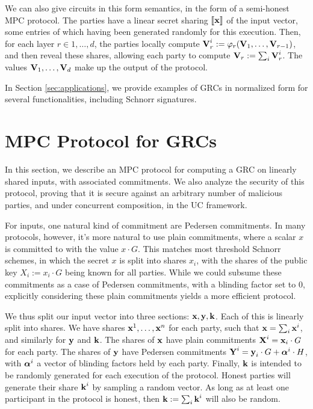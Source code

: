 We can also give circuits in this form semantics, in the form
of a semi-honest MPC protocol.
The parties have a linear secret sharing $\llbracket\textbf{x}\rrbracket$ of
the input vector, some entries of which having been generated randomly
for this execution.
Then, for each layer $r \in 1, \ldots, d$, the parties locally
compute $\textbf{V}_r^i := \varphi_r(\textbf{V}_1, \ldots, \textbf{V}_{r - 1})$,
and then reveal these shares, allowing each party to compute
$\textbf{V}_r := \sum_i \textbf{V}_r^i$.
The values $\textbf{V}_1, \ldots, \textbf{V}_d$ make up the output of the protocol.

In Section \ref{sec:applications}, we provide examples of GRCs
in normalized form for several functionalities, including Schnorr
signatures.

\section{MPC Protocol for GRCs}

In this section, we describe an MPC protocol for computing
a GRC on linearly shared inputs, with associated commitments.
We also analyze the security of this protocol, proving that it
is secure against an arbitrary number of malicious parties,
and under concurrent composition, in the UC framework.

For inputs, one natural kind of commitment are Pedersen commitments.
In many protocols, however, it's more natural to use plain commitments,
where a scalar $x$ is committed to with the value $x \cdot G$.
This matches most threshold Schnorr schemes,
in which the secret $x$ is split into shares $x_i$, with the shares
of the public key $X_i := x_i \cdot G$ being known for all parties.
While we could subsume these commitments as a case of Pedersen commitments,
with a blinding factor set to $0$, explicitly considering these
plain commitments yields a more efficient protocol.

We thus split our input vector into three sections: $\textbf{x}, \textbf{y}, \textbf{k}$.
Each of this is linearly split into shares.
We have shares $\textbf{x}^1, \ldots, \textbf{x}^n$ for each party, such that $\textbf{x} = \sum_i \textbf{x}^i$,
and similarly for $\textbf{y}$ and $\textbf{k}$.
The shares of $\textbf{x}$ have plain commitments $\textbf{X}^i = \textbf{x}_i \cdot G$
for each party.
The shares of $\textbf{y}$ have Pedersen commitments $\textbf{Y}^i = \textbf{y}_i \cdot G + \boldsymbol{\alpha}^i \cdot H$,
with $\boldsymbol{\alpha}^i$ a vector of blinding factors held by each party.
Finally, $\textbf{k}$ is intended to be randomly generated for each execution
of the protocol.
Honest parties will generate their share $\textbf{k}^i$ by sampling a random
vector.
As long as at least one participant in the protocol is honest,
then $\textbf{k} := \sum_i \textbf{k}^i$ will also be random.


